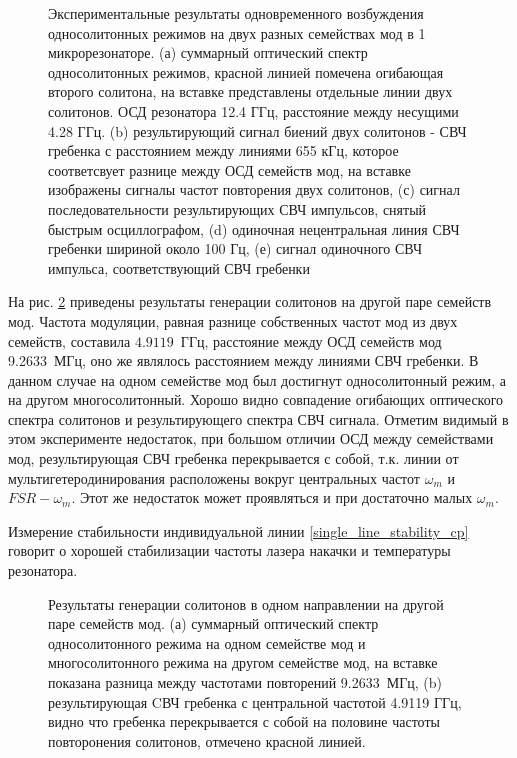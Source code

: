 \begin{figure}[ht]
\begin{minipage}[ht]{1\linewidth}
\end{minipage}
\caption{Экспериментальные результаты одновременного возбуждения односолитонных режимов на двух разных семействах мод в 1 микрорезонаторе. (а) суммарный оптический спектр односолитонных режимов, красной линией помечена огибающая второго солитона, на вставке представлены отдельные линии двух солитонов. ОСД резонатора 12.4 ГГц, расстояние между несущими 4.28 ГГц. (b) результирующий сигнал биений двух солитонов - СВЧ гребенка с расстоянием между линиями 655 кГц, которое соответсвует разнице между ОСД семейств мод, на вставке изображены сигналы частот повторения двух солитонов, (с) сигнал последовательности результирующих СВЧ импульсов, снятый быстрым осциллографом, (d) одиночная нецентральная линия СВЧ гребенки шириной около 100 Гц, (е) сигнал одиночного СВЧ импульса, соответствующий СВЧ гребенки}
\label{Co_Scheme_results}
\end{figure}

На рис. \ref{coscheme_different_types} приведены результаты генерации солитонов на другой паре семейств мод. Частота модуляции, равная разнице собственных частот мод из двух семейств, составила $4.9119$~ГГц, расстояние между ОСД семейств мод 9.2633~МГц, оно же являлось расстоянием между линиями СВЧ гребенки. В данном случае на одном семействе мод был достигнут односолитонный режим, а на другом многосолитонный. Хорошо видно совпадение огибающих оптического спектра солитонов и результирующего спектра СВЧ сигнала. Отметим видимый в этом эксперименте недостаток, при большом отличии ОСД между семействами мод, результирующая СВЧ гребенка перекрывается с собой, т.к. линии от мультигетеродинирования расположены вокруг центральных частот $\omega_m$ и $FSR-\omega_m$. Этот же недостаток может проявляться и при достаточно малых $\omega_m$.

Измерение стабильности индивидуальной линии \ref{single_line_stability_cp} говорит о хорошей стабилизации частоты лазера накачки и температуры резонатора.

\begin{figure}[ht]
\begin{minipage}[ht]{1\linewidth}
\end{minipage}
\caption{Результаты генерации солитонов в одном направлении на другой паре семейств мод. (а) суммарный оптический спектр односолитонного режима на одном семействе мод и многосолитонного режима на другом семействе мод, на вставке показана разница между частотами повторений 9.2633~МГц, (b) результирующая CВЧ гребенка с центральной частотой 4.9119 ГГц, видно что гребенка перекрывается с собой на половине частоты повторонения солитонов, отмечено красной линией.}
\label{coscheme_different_types}
\end{figure}

